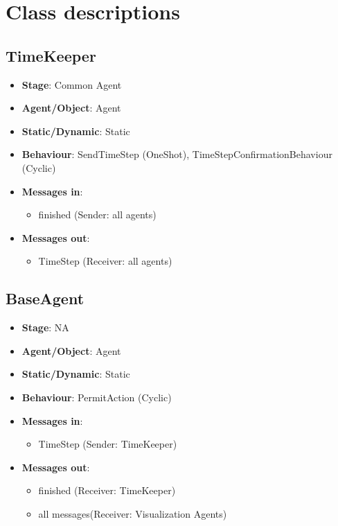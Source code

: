 \documentclass[12pt]{article}
\begin{document}
\newpage{}
\section{Class descriptions}%
\label{sec:agent_descriptions}

\subsection{TimeKeeper}
\begin{itemize}
    \item \textbf{Stage}: Common Agent
    \item \textbf{Agent/Object}: Agent
    \item \textbf{Static/Dynamic}: Static
    \item \textbf{Behaviour}: SendTimeStep (OneShot), TimeStepConfirmationBehaviour (Cyclic)
    \item \textbf{Messages in}: 
        \begin{itemize}
            \item  finished (Sender: all agents)
        \end{itemize}
    \item \textbf{Messages out}:
        \begin{itemize}
            \item  TimeStep (Receiver: all agents)
        \end{itemize}
\end{itemize}

\subsection{BaseAgent}
\begin{itemize}
    \item \textbf{Stage}: NA
    \item \textbf{Agent/Object}: Agent
    \item \textbf{Static/Dynamic}: Static  
    \item \textbf{Behaviour}: PermitAction (Cyclic)
    \item \textbf{Messages in}:
        \begin{itemize}
            \item  TimeStep (Sender: TimeKeeper)
        \end{itemize}
    \item \textbf{Messages out}:
        \begin{itemize}
            \item  finished (Receiver: TimeKeeper)
            \item  all messages(Receiver: Visualization Agents)
        \end{itemize}
\end{itemize}
\newpage{}
\end{document}

